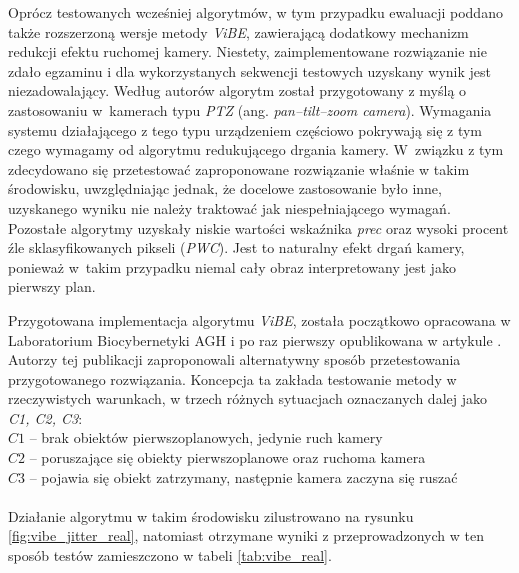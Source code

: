 Oprócz testowanych wcześniej algorytmów, w tym przypadku ewaluacji poddano także rozszerzoną wersje metody \textit{ViBE}, zawierającą dodatkowy mechanizm redukcji efektu ruchomej kamery. 
Niestety, zaimplementowane rozwiązanie nie zdało egzaminu i dla wykorzystanych sekwencji testowych uzyskany wynik jest niezadowalający. Według autorów algorytm został przygotowany z myślą o zastosowaniu w~kamerach typu \textit{PTZ} (ang. \textit{pan–tilt–zoom camera}). Wymagania systemu działającego z tego typu urządzeniem częściowo pokrywają się z tym czego wymagamy od algorytmu redukującego drgania kamery. W~związku z tym zdecydowano się przetestować zaproponowane rozwiązanie właśnie w takim środowisku, uwzględniając jednak, że docelowe zastosowanie było inne, uzyskanego wyniku nie należy traktować jak niespełniającego wymagań.
Pozostałe algorytmy uzyskały niskie wartości wskaźnika \textit{prec} oraz wysoki procent źle sklasyfikowanych pikseli (\textit{PWC}). 
Jest to naturalny efekt drgań kamery, ponieważ w~takim przypadku niemal cały obraz interpretowany jest jako pierwszy plan.

Przygotowana implementacja algorytmu \textit{ViBE}, została początkowo opracowana w Laboratorium Biocybernetyki AGH i po raz pierwszy opublikowana w artykule \cite{kryjak_14_vibe}. 
Autorzy tej publikacji zaproponowali alternatywny sposób przetestowania przygotowanego rozwiązania. 
Koncepcja ta zakłada testowanie metody w rzeczywistych warunkach, w trzech różnych sytuacjach oznaczanych dalej jako \textit{C1, C2, C3}:\\
\-\hspace{1cm} $C1$ -- brak obiektów pierwszoplanowych, jedynie ruch kamery\\
\-\hspace{1cm} $C2$ -- poruszające się obiekty pierwszoplanowe oraz ruchoma kamera\\
\-\hspace{1cm} $C3$ -- pojawia się obiekt zatrzymany, następnie kamera zaczyna się ruszać\\
\\
\noindent Działanie algorytmu w takim środowisku zilustrowano na rysunku \ref{fig:vibe_jitter_real}, natomiast otrzymane wyniki z przeprowadzonych w ten sposób testów zamieszczono w tabeli \ref{tab:vibe_real}.

